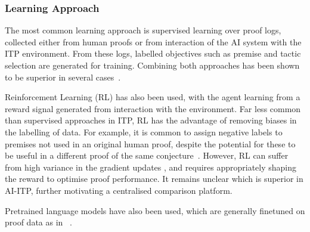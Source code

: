 \documentclass[letterpaper]{article} %
\begin{document}
    \subsubsection{Learning Approach}
    The most common learning approach is supervised learning over proof logs, collected either from human proofs or from interaction of the AI system with the ITP environment. From these logs, labelled objectives such as premise and tactic selection are generated for training.
    Combining both approaches has been shown to be superior in several cases~\cite{lample_hypertree_2022, bansal_learning_2019, polu_formal_2022}.

    Reinforcement Learning (RL) has also been used, with the agent learning from a reward signal generated from interaction with the environment.
    Far less common than supervised approaches in ITP, RL has the advantage of removing biases in the labelling of data.
    For example, it is common to assign negative labels to premises not used in an original human proof,
    despite the potential for these to be useful in a different proof of the same conjecture~\cite{kaliszyk_holstep_2017, kaliszyk_mizar_2015, bansal_holist_2019}.
    However, RL can suffer from high variance in the gradient updates \cite{sutton_reinforcement_2018}, and requires appropriately shaping the reward to optimise proof performance.
    It remains unclear which is superior in AI-ITP, further motivating a centralised comparison platform.

    Pretrained language models have also been used, which are generally finetuned on proof data as in ~\cite{lample_hypertree_2022, polu_formal_2022,  han_proof_2021}.
\end{document}
